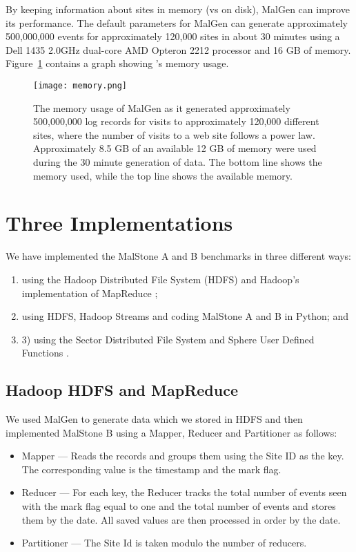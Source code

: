 \documentclass{acm_proc_article-sp}
\def\malstone{MalStone } \def\malgen{MalGen }
\begin{document}
By keeping information about sites in memory (vs on disk), \malgen can
improve its performance.  The default parameters for \malgen can
generate approximately 500,000,000 events for approximately
120,000 sites in about 30 minutes using a Dell 1435 2.0GHz dual-core
AMD Opteron 2212 processor and 16 GB of memory.
Figure~\ref{figure:memory} contains a graph showing \malgenns's memory
usage.


\begin{figure}
\centering
\texttt{[image: memory.png]}
\caption{The memory usage of \malgen as it generated approximately
500,000,000 log records for visits to approximately 120,000 different
sites, where the number of visits to a web site follows a power law.
Approximately 8.5 GB of an available 12 GB of memory were used during
the 30 minute generation of data.  The bottom line shows the memory used,
while the top line shows the available memory.}
\label{figure:memory}
\end{figure}


\section{Three Implementations}

We have implemented the \malstone A and B benchmarks in three different
ways: 
\begin{enumerate}
\item using the Hadoop Distributed File System (HDFS) \cite{Borthakur:2007}
and Hadoop's implementation of MapReduce \cite{Hadoop:2010}; 
\item using HDFS, Hadoop Streams \cite{Hadoop:2010} and coding \malstone 
A and B in Python; and
\item 3) using the Sector Distributed File System
and Sphere User Defined Functions \cite{Grossman:PTRSA09}.
\end{enumerate}

\subsection{Hadoop HDFS and MapReduce}
\label{section-hadoop}

We used \malgen to generate data which we stored in HDFS and then
implemented \malstone B using a Mapper, Reducer and Partitioner as follows:

\begin{itemize}

\item Mapper --- Reads the records and groups them using the Site ID
as the key.  The corresponding value is the timestamp and the mark flag.

\item Reducer --- For each key, the Reducer tracks the total number of
  events seen with the mark flag equal to one and the total number of
  events and stores them by the date.  All saved values are then
  processed in order by the date.

\item Partitioner --- The Site Id is taken modulo the number of reducers.

\end{itemize}
\end{document}
